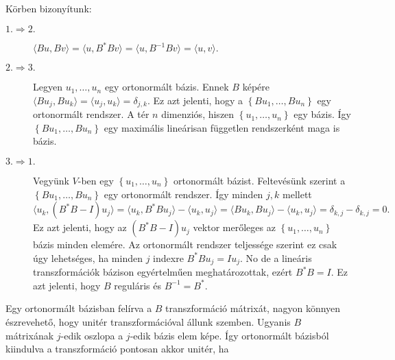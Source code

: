 \documentclass[9pt, a4paper, showtrims]{memoir}
\makeatletter
\renewenvironment{proof}[1][\proofname]
    {\par\pushQED{\qed}%
    \normalfont \topsep6\p@\@plus6\p@\relax
    \trivlist
    \item[\hskip\labelsep
        \itshape
    #1\@addpunct{:}]\ignorespaces}
    {\popQED\endtrivlist\@endpefalse}
\theoremstyle{plain}
\theoremstyle{remark}
\theoremstyle{definition}
\newcommand{\ip}[2]{\langle#1,#2\rangle}
\makeatother
\begin{document}
\begin{proof}
    Körben bizonyítunk:
    \begin{description}
        \item[$1.\Rightarrow 2.$]
            \begin{math}
            \ip{Bu}{Bv}
            =
            \ip{u}{B^\ast Bv}
            =
            \ip{u}{B^{-1}Bv}
            =
            \ip{u}{v}.
        \end{math}
    \item[$2.\Rightarrow 3.$]
        Legyen $u_1,\dots,u_n$ egy ortonormált bázis.
        Ennek $B$ képére
        \begin{math}
            \ip{Bu_j}{Bu_k}
            =
            \ip{u_j}{u_k}
            =\delta_{j,k}.
        \end{math}
        Ez azt jelenti, hogy a $\left\{ Bu_1,\dots,Bu_n \right\}$ egy ortonormált rendszer.
        A tér $n$ dimenziós, hiszen $\left\{ u_1,\dots,u_n \right\}$ egy bázis.
        Így
        $\left\{ Bu_1,\dots,Bu_n \right\}$ egy maximális lineárisan független rendszerként maga is bázis.
    \item[$3.\Rightarrow 1.$]
        Vegyünk $V$-ben egy $\left\{ u_1,\dots,u_n \right\}$ ortonormált bázist.
        Feltevésünk szerint a $\left\{ Bu_1,\dots,Bu_n \right\}$ egy ortonormált rendszer.
        Így minden $j,k$ mellett
        \begin{displaymath}
            \ip{u_k}{\left( B^\ast B-I \right)u_j}
            =
            \ip{u_k}{B^\ast Bu_j}-\ip{u_k}{u_j} 
            =
            \ip{Bu_k}{Bu_j}-\ip{u_k}{u_j}
            =
            \delta_{k,j}-\delta_{k,j}
            =
            0.
        \end{displaymath}
        Ez azt jelenti, hogy az $(B^\ast B-I)u_j$ vektor merőleges az $\left\{ u_1,\dots,u_n \right\}$ bázis minden elemére.
        Az ortonormált rendszer teljessége szerint ez csak úgy lehetséges, ha minden $j$ indexre $B^\ast Bu_j=Iu_j$.
        No de a lineáris transzformációk bázison egyértelműen meghatározottak,
        ezért $B^\ast B=I$.
        Ez azt jelenti, hogy $B$ reguláris és $B^{-1}=B^\ast$.
    \end{description}
\end{proof}
Egy ortonormált bázisban felírva a $B$ transzformáció mátrixát,
nagyon könnyen észrevehető, hogy unitér transzformációval állunk szemben.
Ugyanis $B$ mátrixának $j$-edik oszlopa a $j$-edik bázis elem képe.
Így ortonormált bázisból kiindulva a transzformáció pontosan akkor unitér, ha 
\end{document}
